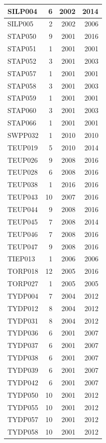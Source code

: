 \documentclass[11pt,]{book}
\begin{document}
\begin{table}
\begin{tabular}[t]{l|r|r|r}
\hline
SILP004 & 6 & 2002 & 2014\\
\hline
SILP005 & 2 & 2002 & 2006\\
\hline
STAP050 & 9 & 2001 & 2016\\
\hline
STAP051 & 1 & 2001 & 2001\\
\hline
STAP052 & 3 & 2001 & 2003\\
\hline
STAP057 & 1 & 2001 & 2001\\
\hline
STAP058 & 3 & 2001 & 2003\\
\hline
STAP059 & 1 & 2001 & 2001\\
\hline
STAP060 & 3 & 2001 & 2003\\
\hline
STAP066 & 1 & 2001 & 2001\\
\hline
SWPP032 & 1 & 2010 & 2010\\
\hline
TEUP019 & 5 & 2010 & 2014\\
\hline
TEUP026 & 9 & 2008 & 2016\\
\hline
TEUP028 & 6 & 2008 & 2016\\
\hline
TEUP038 & 1 & 2016 & 2016\\
\hline
TEUP043 & 10 & 2007 & 2016\\
\hline
TEUP044 & 9 & 2008 & 2016\\
\hline
TEUP045 & 7 & 2008 & 2014\\
\hline
TEUP046 & 7 & 2008 & 2016\\
\hline
TEUP047 & 9 & 2008 & 2016\\
\hline
TIEP013 & 1 & 2006 & 2006\\
\hline
TORP018 & 12 & 2005 & 2016\\
\hline
TORP027 & 1 & 2005 & 2005\\
\hline
TYDP004 & 7 & 2004 & 2012\\
\hline
TYDP012 & 8 & 2004 & 2012\\
\hline
TYDP031 & 8 & 2004 & 2012\\
\hline
TYDP036 & 6 & 2001 & 2007\\
\hline
TYDP037 & 6 & 2001 & 2007\\
\hline
TYDP038 & 6 & 2001 & 2007\\
\hline
TYDP039 & 6 & 2001 & 2007\\
\hline
TYDP042 & 6 & 2001 & 2007\\
\hline
TYDP050 & 10 & 2001 & 2012\\
\hline
TYDP055 & 10 & 2001 & 2012\\
\hline
TYDP057 & 10 & 2001 & 2012\\
\hline
TYDP058 & 10 & 2001 & 2012\\

\end{tabular}
\end{table}
\end{document}
